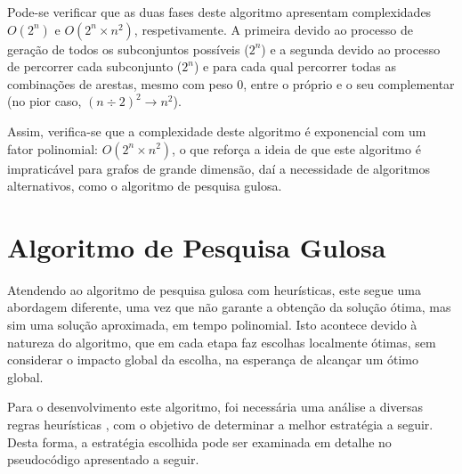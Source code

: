 \documentclass[mirror]{revdetua}
\begin{document}
Pode-se verificar que as duas fases deste algoritmo apresentam complexidades $O(2^n)$ e $O(2^n \times n^2)$, respetivamente. A primeira devido ao processo de geração de todos os subconjuntos possíveis ($2^n$) e a segunda devido ao processo de percorrer cada subconjunto ($2^n$) e para cada qual percorrer todas as combinações de arestas, mesmo com peso $0$, entre o próprio e o seu complementar (no pior caso, $(n \div 2)^2 \rightarrow n^2$).

Assim, verifica-se que a complexidade deste algoritmo é exponencial com um fator polinomial: $O(2^n \times n^2)$, o que reforça a ideia de que este algoritmo é impraticável para grafos de grande dimensão, daí a necessidade de algoritmos alternativos, como o algoritmo de pesquisa gulosa.


\section{Algoritmo de Pesquisa Gulosa}

Atendendo ao algoritmo de pesquisa gulosa com heurísticas, este segue uma abordagem diferente, uma vez que não garante a obtenção da solução ótima, mas sim uma solução aproximada, em tempo polinomial. Isto acontece devido à natureza do algoritmo, que em cada etapa faz escolhas localmente ótimas, sem considerar o impacto global da escolha, na esperança de alcançar um ótimo global.

Para o desenvolvimento este algoritmo, foi necessária uma análise a diversas regras heurísticas \cite{WANG23}, com o objetivo de determinar a melhor estratégia a seguir. Desta forma, a estratégia escolhida pode ser examinada em detalhe no pseudocódigo apresentado a seguir.
\end{document}
